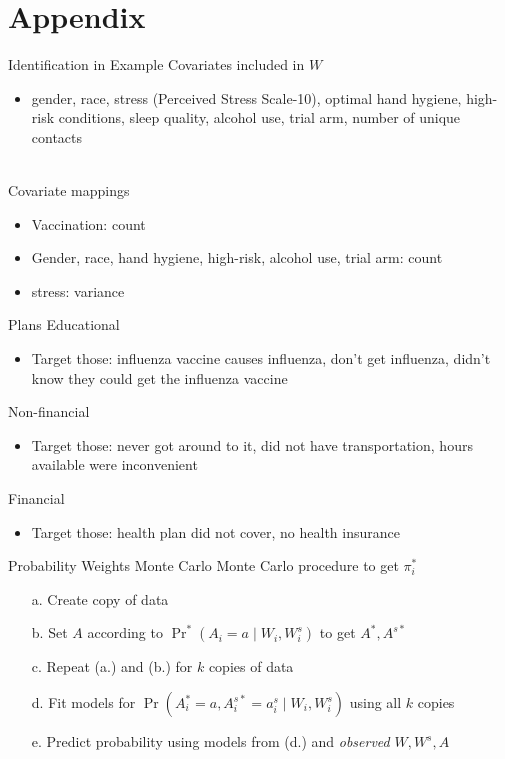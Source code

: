 \documentclass{beamer}
\begin{document}
\section{Appendix}

\begin{frame}{Identification in Example}
	Covariates included in $W$
	\begin{itemize}
		\item gender, race, stress (Perceived Stress Scale-10), optimal hand hygiene, high-risk conditions, sleep quality, alcohol use, trial arm, number of unique contacts
	\end{itemize}
	~\\
	Covariate mappings
	\begin{itemize}
		\item Vaccination: count
		\item Gender, race, hand hygiene, high-risk, alcohol use, trial arm: count
		\item stress: variance
	\end{itemize}	
\end{frame}

\begin{frame}{Plans}
	Educational
	\begin{itemize}
		\item Target those: influenza vaccine causes influenza, don't get influenza, didn't know they could get the influenza vaccine
	\end{itemize}
	Non-financial
	\begin{itemize}
		\item Target those: never got around to it, did not have transportation, hours available were inconvenient
	\end{itemize}
	Financial
	\begin{itemize}
		\item Target those: health plan did not cover, no health insurance
	\end{itemize}
\end{frame}

\begin{frame}{Probability Weights Monte Carlo}
	Monte Carlo procedure to get $\pi_i^*$
	\begin{itemize}
		\item[a.] Create copy of data
		\item[b.] Set $A$ according to ${\Pr}^*(A_i = a \mid W_i, W_i^s)$ to get $A^*, A^{s*}$
		\item[c.] Repeat (a.) and (b.) for $k$ copies of data
		\item[d.] Fit models for $\Pr(A_i^* = a, A_i^{s*} = a_i^s \mid W_i, W_i^s)$ using all $k$ copies
		\item[e.] Predict probability using models from (d.) and \textit{observed} $W,W^s,A$
	\end{itemize}
\end{frame}
\end{document}
